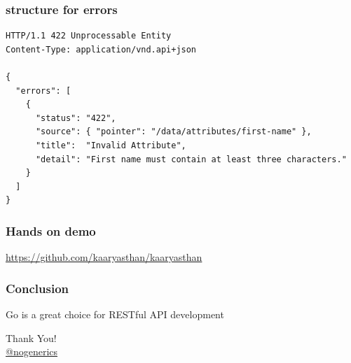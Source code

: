 \documentclass[aspectratio=169]{beamer}
\begin{document}
\begin{frame}[fragile]
  \frametitle{structure for errors}

  \begin{Verbatim}[fontsize=\tiny]
HTTP/1.1 422 Unprocessable Entity
Content-Type: application/vnd.api+json

{
  "errors": [
    {
      "status": "422",
      "source": { "pointer": "/data/attributes/first-name" },
      "title":  "Invalid Attribute",
      "detail": "First name must contain at least three characters."
    }
  ]
}
  \end{Verbatim}

\end{frame}

\begin{frame}
  \frametitle{Hands on demo}

  \url{https://github.com/kaaryasthan/kaaryasthan}

\end{frame}

\begin{frame}
  \frametitle{Conclusion}

  Go is a great choice for RESTful API development\!

\end{frame}

\begin{frame}
  \begin{center}
    {\huge Thank You!}\\[1cm]
    {\large \href{https://twitter.com/nogenerics}{@nogenerics}}
  \end{center}
\end{frame}
\end{document}
